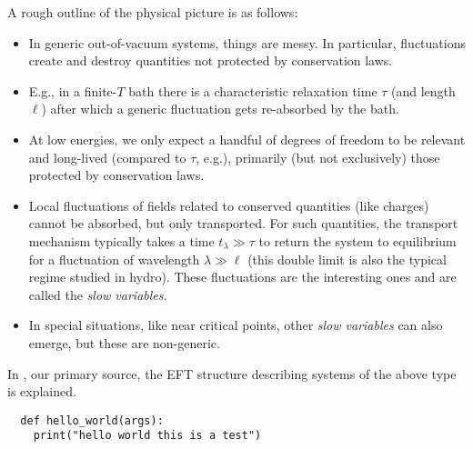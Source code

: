 \documentclass[11pt]{article}
\begin{document}
A rough outline of the physical picture is as follows:
\begin{itemize}
\item In generic out-of-vacuum systems, things are messy.  In particular, fluctuations create and destroy quantities not protected by conservation laws.
\item E.g., in a finite-$T$ bath there is a characteristic relaxation time $\tau$ (and length $\ell$) after which a generic fluctuation gets re-absorbed by the bath.
\item At low energies, we only expect a handful of degrees of freedom to be relevant and long-lived (compared to $\tau$, e.g.), primarily (but not exclusively) those protected by conservation laws.
\item Local fluctuations of fields related to conserved quantities (like charges) cannot be absorbed, but only transported.  For such quantities, the transport mechanism typically takes a time $t_{\lambda}\gg \tau$ to return the system to equilibrium for a fluctuation of wavelength $\lambda \gg \ell$ (this double limit is also the typical regime studied in hydro).  These fluctuations are the interesting ones and are called the \textit{slow variables.}
\item In special situations, like near critical points, other \textit{slow variables} can also emerge, but these are non-generic.
\end{itemize}
In \cite{Glorioso:2018wxw}, our primary source, the EFT structure describing systems of the above type is explained.

\begin{verbatim}
  def hello_world(args):
    print("hello world this is a test")
\end{verbatim}



\end{document}
